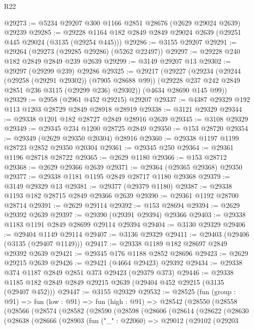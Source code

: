 \begin{lexlean}{R22}
\begin{coremodule}
@29273 := @5234 @29207 @300 @1166 @2851 @28676 (@2629 @29024 @2639) @29239
@29285 := @29228 @1164 @182 @2849 @2849 @29024 @2639 (@29251 @445 @29024 (@3135 (@29254 @445)))
@29286 := @3155 @29207
@29291 := @29264 (@29273 (@29285 @29286) (@5262 @22497))
@29297 := @29228 @240 @182 @2849 @2849 @239 @2639
@29299 := @3149 @29207 @13
@29302 := @29297 (@29299 @239) @29286
@29325 := @29217
    (@29227
      (@29234
        (@29244 (@29258 (@29291 @29302)) (@7905 @28688 @99))
        (@29228 @237 @242 @2849 @2851 @236 @3115 (@29299 @236) @29302))
      (@4634 @28690 @145 @99))
@29329 := @2958 (@2961 @452 @29215) @29207
@29337 := @4387 @29329 @192 @113 @1203 @28729 @2849 @28918 @28919
@29338 := @3121 @29329
@29344 := @29338 @1201 @182 @28727 @2849 @28916 @2639
@29345 := @3108 @29329
@29349 := @29345 @234 @1200 @28725 @2849
@29350 := @153 @28720
@29354 := @29349 (@2629 @29350 @20304) @28916
@29360 := @29338 @1197 @1199 @28723 @2852 @29350 @20304
@29361 := @29345 @250
@29364 := @29361 @1196 @28718 @28722
@29365 := @2629 @1180
@29366 := @153 @28712
@29368 := @2629 @29366 @2639
@29371 := @29364 (@29365 @29368) @29350
@29377 := @29338 @1181 @1195 @2849 @28717 @1180 @29368
@29379 := @3149 @29329 @13
@29381 := @29377 (@29379 @1180)
@29387 := @29338 @1193 @182 @28715 @2849 @29366 @2639
@29390 := @29361 @1192 @28700 @28714
@29391 := @2629 @29114
@29392 := @153 @28694
@29394 := @2629 @29392 @2639
@29397 := @29390 (@29391 @29394) @29366
@29403 := @29338 @1183 @1191 @2849 @28699 @29114 @29394
@29404 := @3130 @29329
@29406 := @29404 @1149 @29114
@29407 := @3136 @29329
@29411 := @29403 (@29406 (@3135 (@29407 @1149)))
@29417 := @29338 @1189 @182 @28697 @2849 @29392 @2639
@29421 := @29345 @176 @1188 @2852 @28696
@29423 := @2629 @29215 @2639
@29426 := @29421 (@4664 @29423) @29392
@29434 := @29338 @374 @1187 @2849 @2851 @373 @29423 (@29379 @373)
@29446 := @29338 @1185 @182 @2849 @2849 @29215 @2639 (@29404 @452 @29215 (@3135 (@29407 @452)))
@29447 := @3155 @29329
@29532 := @28525
    (fun (group : @91) =>
    fun (low : @91) =>
    fun (high : @91) =>
    @28542
      (@28550
        (@28558
          (@28566
            (@28574
              (@28582
                (@28590
                  (@28598
                    (@28606
                      (@28614
                        (@28622
                          (@28630
                            (@28638
                              (@28666
                                (@28903
                                  (fun ("_" : @22060) =>
                                  @29012
                                    (@29102
                                      (@29203

\end{coremodule}
\end{lexlean}
